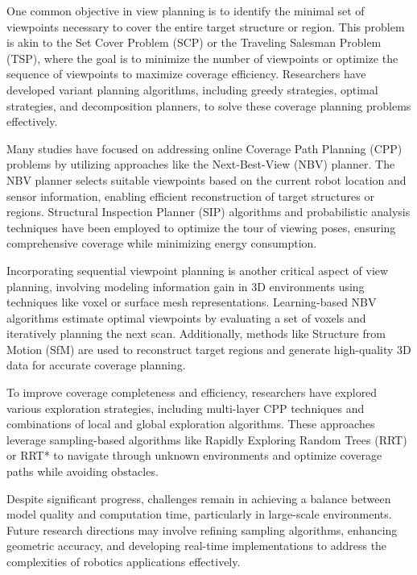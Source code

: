One common objective in view planning is to identify the minimal set of viewpoints necessary to cover the entire target structure or region. This problem is akin to the Set Cover Problem (SCP) or the Traveling Salesman Problem (TSP), where the goal is to minimize the number of viewpoints or optimize the sequence of viewpoints to maximize coverage efficiency. Researchers have developed variant planning algorithms, including greedy strategies, optimal strategies, and decomposition planners, to solve these coverage planning problems effectively.

\vspace*{6mm}

Many studies have focused on addressing online Coverage Path Planning (CPP) problems by utilizing approaches like the Next-Best-View (NBV) planner. The NBV planner selects suitable viewpoints based on the current robot location and sensor information, enabling efficient reconstruction of target structures or regions. Structural Inspection Planner (SIP) algorithms and probabilistic analysis techniques have been employed to optimize the tour of viewing poses, ensuring comprehensive coverage while minimizing energy consumption.

\vspace*{6mm}

Incorporating sequential viewpoint planning is another critical aspect of view planning, involving modeling information gain in 3D environments using techniques like voxel or surface mesh representations. Learning-based NBV algorithms estimate optimal viewpoints by evaluating a set of voxels and iteratively planning the next scan. Additionally, methods like Structure from Motion (SfM) are used to reconstruct target regions and generate high-quality 3D data for accurate coverage planning.

\vspace*{6mm}

To improve coverage completeness and efficiency, researchers have explored various exploration strategies, including multi-layer CPP techniques and combinations of local and global exploration algorithms. These approaches leverage sampling-based algorithms like Rapidly Exploring Random Trees (RRT) or RRT* to navigate through unknown environments and optimize coverage paths while avoiding obstacles.

\vspace*{6mm}

Despite significant progress, challenges remain in achieving a balance between model quality and computation time, particularly in large-scale environments. Future research directions may involve refining sampling algorithms, enhancing geometric accuracy, and developing real-time implementations to address the complexities of robotics applications effectively.

